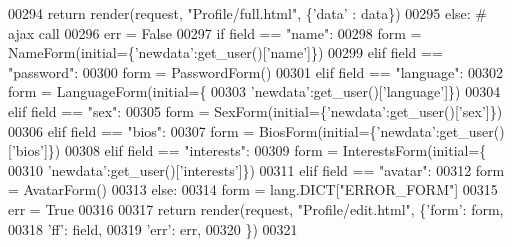 \begin{DoxyCode}
00294                 \textcolor{keywordflow}{return} render(request, \textcolor{stringliteral}{"Profile/full.html"}, \{\textcolor{stringliteral}{'data'} : data\})
00295             \textcolor{keywordflow}{else}: \textcolor{comment}{# ajax call}
00296                 err = \textcolor{keyword}{False}
00297                 \textcolor{keywordflow}{if}   field == \textcolor{stringliteral}{"name"}:
00298                     form = NameForm(initial=\{\textcolor{stringliteral}{'newdata'}:get\_user()[\textcolor{stringliteral}{'name'}]\})
00299                 \textcolor{keywordflow}{elif} field == \textcolor{stringliteral}{"password"}:
00300                     form = PasswordForm()
00301                 \textcolor{keywordflow}{elif} field == \textcolor{stringliteral}{"language"}:
00302                     form = LanguageForm(initial=\{
00303                             \textcolor{stringliteral}{'newdata'}:get\_user()[\textcolor{stringliteral}{'language'}]\})
00304                 \textcolor{keywordflow}{elif} field == \textcolor{stringliteral}{"sex"}:
00305                     form = SexForm(initial=\{\textcolor{stringliteral}{'newdata'}:get\_user()[\textcolor{stringliteral}{'sex'}]\})
00306                 \textcolor{keywordflow}{elif} field == \textcolor{stringliteral}{"bios"}:
00307                     form = BiosForm(initial=\{\textcolor{stringliteral}{'newdata'}:get\_user()[\textcolor{stringliteral}{'bios'}]\})
00308                 \textcolor{keywordflow}{elif} field == \textcolor{stringliteral}{"interests"}:
00309                     form = InterestsForm(initial=\{
00310                             \textcolor{stringliteral}{'newdata'}:get\_user()[\textcolor{stringliteral}{'interests'}]\})
00311                 \textcolor{keywordflow}{elif} field == \textcolor{stringliteral}{"avatar"}:
00312                     form = AvatarForm()
00313                 \textcolor{keywordflow}{else}:
00314                     form = lang.DICT[\textcolor{stringliteral}{"ERROR\_FORM"}]
00315                     err = \textcolor{keyword}{True} 
00316 
00317                 \textcolor{keywordflow}{return} render(request, \textcolor{stringliteral}{"Profile/edit.html"}, \{\textcolor{stringliteral}{'form'}: form,
00318                                                              \textcolor{stringliteral}{'ff'}: field,
00319                                                              \textcolor{stringliteral}{'err'}: err,
00320                                                             \})
00321         

\end{DoxyCode}


